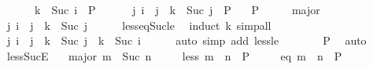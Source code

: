 \begin{isabellebody}
\ \ \ \ \ {}{\isacharcolon}{\kern0pt}\ {\isachardoublequoteopen}k\ {\isacharequal}{\kern0pt}\ Suc\ i\ {\isasymLongrightarrow}\ P{\isachardoublequoteclose}\isanewline
\ \ \ \ \ {}{\isacharcolon}{\kern0pt}\ {\isachardoublequoteopen}{\isasymAnd}j{\isachardot}{\kern0pt}\ i\ {\isacharless}{\kern0pt}\ j\ {\isasymLongrightarrow}\ k\ {\isacharequal}{\kern0pt}\ Suc\ j\ {\isasymLongrightarrow}\ P{\isachardoublequoteclose}\isanewline
\ \ \ P\isanewline
%
\isadelimproof
%
\endisadelimproof
%
\isatagproof
{}\isamarkupfalse%
\ {\isacharminus}{\kern0pt}\isanewline
\ \ \isamarkupfalse%
\ major\ \isamarkupfalse%
\ {\isachardoublequoteopen}{\isasymexists}j{\isachardot}{\kern0pt}\ i\ {\isasymle}\ j\ {\isasymand}\ k\ {\isacharequal}{\kern0pt}\ Suc\ j{\isachardoublequoteclose}\isanewline
\ \ \ \ \isamarkupfalse%
\ less{\isacharunderscore}{\kern0pt}eq{\isacharunderscore}{\kern0pt}Suc{\isacharunderscore}{\kern0pt}le\ \isamarkupfalse%
\ {\isacharparenleft}{\kern0pt}induct\ k{\isacharparenright}{\kern0pt}\ simp{\isacharunderscore}{\kern0pt}all\isanewline
\ \ \isamarkupfalse%
\ \isamarkupfalse%
\ {\isachardoublequoteopen}{\isacharparenleft}{\kern0pt}{\isasymexists}j{\isachardot}{\kern0pt}\ i\ {\isacharless}{\kern0pt}\ j\ {\isasymand}\ k\ {\isacharequal}{\kern0pt}\ Suc\ j{\isacharparenright}{\kern0pt}\ {\isasymor}\ k\ {\isacharequal}{\kern0pt}\ Suc\ i{\isachardoublequoteclose}\isanewline
\ \ \ \ \isamarkupfalse%
\ {\isacharparenleft}{\kern0pt}auto\ simp\ add{\isacharcolon}{\kern0pt}\ less{\isacharunderscore}{\kern0pt}le{\isacharparenright}{\kern0pt}\isanewline
\ \ \isamarkupfalse%
\ {}\ {}\ \isamarkupfalse%
\ P\ \isamarkupfalse%
\ auto\isanewline
{}\isamarkupfalse%
%
\endisatagproof
{\isafoldproof}%
%
\isadelimproof
\isanewline
%
\endisadelimproof
\isanewline
{}\isamarkupfalse%
\ less{\isacharunderscore}{\kern0pt}SucE{\isacharcolon}{\kern0pt}\isanewline
\ \ \ major{\isacharcolon}{\kern0pt}\ {\isachardoublequoteopen}m\ {\isacharless}{\kern0pt}\ Suc\ n{\isachardoublequoteclose}\isanewline
\ \ \ \ \ less{\isacharcolon}{\kern0pt}\ {\isachardoublequoteopen}m\ {\isacharless}{\kern0pt}\ n\ {\isasymLongrightarrow}\ P{\isachardoublequoteclose}\isanewline
\ \ \ \ \ eq{\isacharcolon}{\kern0pt}\ {\isachardoublequoteopen}m\ {\isacharequal}{\kern0pt}\ n\ {\isasymLongrightarrow}\ P{\isachardoublequoteclose}\isanewline

\end{isabellebody}
